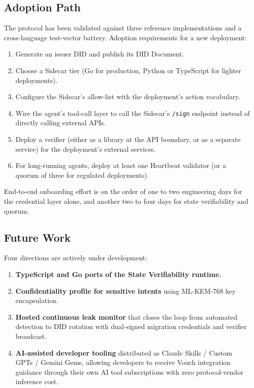 \documentclass[11pt,a4paper,twocolumn]{article}
\begin{document}
\subsection{Adoption Path}

The protocol has been validated against three reference implementations and a cross-language test-vector battery. Adoption requirements for a new deployment:

\begin{enumerate}[label=\arabic*.,leftmargin=*]
\item Generate an issuer DID and publish its DID Document.
\item Choose a Sidecar tier (Go for production, Python or TypeScript for lighter deployments).
\item Configure the Sidecar's allow-list with the deployment's action vocabulary.
\item Wire the agent's tool-call layer to call the Sidecar's \verb|/sign| endpoint instead of directly calling external APIs.
\item Deploy a verifier (either as a library at the API boundary, or as a separate service) for the deployment's external services.
\item For long-running agents, deploy at least one Heartbeat validator (or a quorum of three for regulated deployments).
\end{enumerate}

End-to-end onboarding effort is on the order of one to two engineering days for the credential layer alone, and another two to four days for state verifiability and quorum.

\subsection{Future Work}

Four directions are actively under development:

\begin{enumerate}[label=\arabic*.,leftmargin=*]
\item \textbf{TypeScript and Go ports of the State Verifiability runtime.}
\item \textbf{Confidentiality profile for sensitive intents} using ML-KEM-768 key encapsulation.
\item \textbf{Hosted continuous leak monitor} that closes the loop from automated detection to DID rotation with dual-signed migration credentials and verifier broadcast.
\item \textbf{AI-assisted developer tooling} distributed as Claude Skills / Custom GPTs / Gemini Gems, allowing developers to receive Vouch integration guidance through their own AI tool subscriptions with zero protocol-vendor inference cost.
\end{enumerate}
\end{document}
